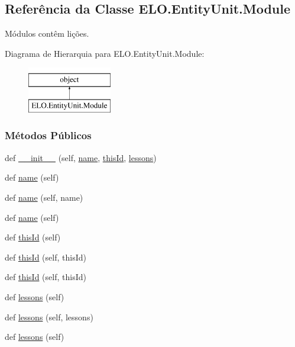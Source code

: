 \hypertarget{classELO_1_1EntityUnit_1_1Module}{}\subsection{Referência da Classe E\+L\+O.\+Entity\+Unit.\+Module}
\label{classELO_1_1EntityUnit_1_1Module}


Módulos contêm lições.  


Diagrama de Hierarquia para E\+L\+O.\+Entity\+Unit.\+Module\+:\begin{figure}[H]
\begin{center}
\leavevmode
\includegraphics[height=2.000000cm]{db/de8/classELO_1_1EntityUnit_1_1Module}
\end{center}
\end{figure}
\subsubsection*{Métodos Públicos}
\begin{DoxyCompactItemize}
\item 
def \hyperlink{classELO_1_1EntityUnit_1_1Module_a1bf236e43d26974e940fac7a99a1d77b}{\+\_\+\+\_\+init\+\_\+\+\_\+} (self, \hyperlink{classELO_1_1EntityUnit_1_1Module_a82adf3b2602714a4df5f0df535902854}{name}, \hyperlink{classELO_1_1EntityUnit_1_1Module_a02fe16e41dd435364cb9073a8a805e96}{this\+Id}, \hyperlink{classELO_1_1EntityUnit_1_1Module_a33eacfd2527f80841b87ccd73eb5fec0}{lessons})
\item 
def \hyperlink{classELO_1_1EntityUnit_1_1Module_a604913f594f7331394d14c26b636866f}{name} (self)
\item 
def \hyperlink{classELO_1_1EntityUnit_1_1Module_a4df153e5397d49155738954608e8538f}{name} (self, name)
\item 
def \hyperlink{classELO_1_1EntityUnit_1_1Module_a604913f594f7331394d14c26b636866f}{name} (self)
\item 
def \hyperlink{classELO_1_1EntityUnit_1_1Module_a0f632ea2543ec7d67da765650e58593c}{this\+Id} (self)
\item 
def \hyperlink{classELO_1_1EntityUnit_1_1Module_abb18c92b2cbb1ee72b45522a47cf70d9}{this\+Id} (self, this\+Id)
\item 
def \hyperlink{classELO_1_1EntityUnit_1_1Module_abb18c92b2cbb1ee72b45522a47cf70d9}{this\+Id} (self, this\+Id)
\item 
def \hyperlink{classELO_1_1EntityUnit_1_1Module_a2ae2bada0ae6fef2a288206b32ada74e}{lessons} (self)
\item 
def \hyperlink{classELO_1_1EntityUnit_1_1Module_acc6aea15be566d1ecff8575da41c6f55}{lessons} (self, lessons)
\item 
def \hyperlink{classELO_1_1EntityUnit_1_1Module_a2ae2bada0ae6fef2a288206b32ada74e}{lessons} (self)
\end{DoxyCompactItemize}
